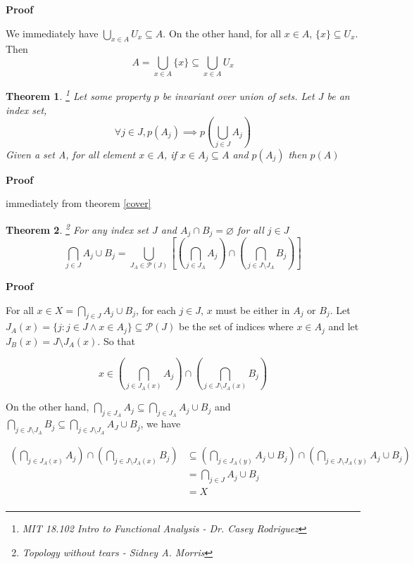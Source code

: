 \documentclass{article}
\newtheorem{theorem}{Theorem}
\let\emptyset\varnothing
\begin{document}
\textbf{Proof}

We immediately have $\bigcup_{x \in A} U_x \subseteq A$. On the other hand, for all $x \in A$, $\{ x \} \subseteq U_x$. Then
$$
    A = \bigcup_{x \in A} \{ x \} \subseteq \bigcup_{x \in A} U_x
$$

\begin{theorem} \footnote{MIT 18.102 Intro to Functional Analysis - Dr. Casey Rodriguez}
    Let some property $p$ be invariant over union of sets. Let $J$ be an index set,
    $$
        \forall j \in J, p(A_j) \implies p \left( \bigcup_{j \in J} A_j \right)
    $$
    Given a set A, for all element $x \in A$, if $x \in A_j \subseteq A$ and $p(A_j)$ then $p(A)$
\end{theorem}



\textbf{Proof}

immediately from theorem \ref{cover}

\begin{theorem} \footnote{Topology without tears - Sidney A. Morris}
For any index set $J$ and $A_j \cap B_j = \emptyset$ for all $j \in J$
$$
    \bigcap_{j \in J} A_j \cup B_j = \bigcup_{J_A \in \mathcal{P}(J)} \left[ \left( \bigcap_{j \in J_A} A_j \right) \cap \left( \bigcap_{j \in J \setminus J_A}  B_j \right) \right]
$$
\end{theorem}

\textbf{Proof}

For all $x \in X = \bigcap_{j \in J} A_j \cup B_j$, for each $j\in J$, $x$ must be either in $A_j$ or $B_j$. Let $J_A(x) = \{j: j \in J \land x \in A_j \} \subseteq \mathcal{P}(J)$ be the set of indices where $x \in A_j$ and let $J_B(x) = J \setminus J_A(x)$. So that

$$
    x \in \left( \bigcap_{j \in J_A(x)} A_j \right) \cap \left( \bigcap_{j \in J \setminus J_A(x)}  B_j \right)
$$

On the other hand, $\bigcap_{j \in J_A} A_j \subseteq \bigcap_{j \in J_A} A_j \cup B_j$ and $\bigcap_{j \in J \setminus J_A}  B_j \subseteq \bigcap_{j \in J \setminus J_A}  A_J \cup B_j$, we have

\begin{align*}
    \left( \bigcap_{j \in J_A(x)} A_j \right) \cap \left( \bigcap_{j \in J \setminus J_A(x)}  B_j \right)
        &\subseteq \left( \bigcap_{j \in J_A(y)} A_j \cup B_j \right) \cap \left( \bigcap_{j \in J \setminus J_A(y)}  A_j \cup B_j \right) \\
        &= \bigcap_{j \in J} A_j \cup B_j \\
        &= X \\
\end{align*}
\end{document}
